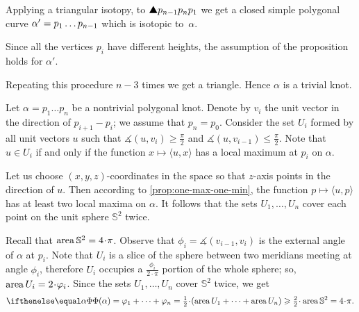 Applying a triangular isotopy, to $\solidtriangle p_{n-1}p_np_1$ we get a closed simple polygonal curve $\alpha'\z=p_1\dots p_{n-1}$ which is isotopic to~$\alpha$.

Since all the vertices $p_i$ have different heights,
the assumption of the proposition holds for $\alpha'$.

Repeating this procedure $n-3$ times we get a triangle.
Hence $\alpha$ is a trivial knot.
\qeds

Let $\alpha=p_1\dots p_n$ be a nontrivial polygonal knot.
Denote by $v_i$ the unit vector in the direction of $p_{i+1}-p_i$;
we assume that $p_n=p_0$.
Consider the set $U_i$ formed by all unit vectors $u$ such that $\measuredangle(u,v_i)\ge \tfrac \pi 2$ and $\measuredangle(u,v_{i-1})\le \tfrac \pi 2$.
Note that $u\in U_i$ if and only if the function $x\mapsto \langle u,x\rangle$ has a local maximum at $p_i$ on $\alpha$.

Let us choose $(x,y,z)$-coordinates in the space so that $z$-axis points in the direction of $u$.
Then according to \ref{prop:one-max-one-min}, the function $p\mapsto \langle u,p\rangle$ has at least two local maxima on $\alpha$.
It follows that the sets $U_1,\dots,U_n$ cover each point on the unit sphere $\mathbb{S}^2$ twice.

Recall that $\area \mathbb{S}^2=4\cdot\pi$.
Observe that $\phi_i=\measuredangle(v_{i-1},v_i)$ is the external angle of $\alpha$ at $p_i$.
Note that $U_i$ is a slice of the sphere between two meridians meeting at angle $\phi_i$, therefore $U_i$ occupies a $\tfrac{\phi_i}{2\cdot\pi}$ portion of the whole sphere; so, $\area U_i=2\cdot \phi_i$.
Since the sets $U_1, \dots, U_n$ cover $\mathbb{S}^2$ twice, we get
\[\tc\alpha=\phi_1+\dots+\phi_n=\tfrac12\cdot (\area U_1+\dots+\area U_n)\ge \tfrac22\cdot \area\mathbb{S}^2=4\cdot\pi.\]
\qedsf



